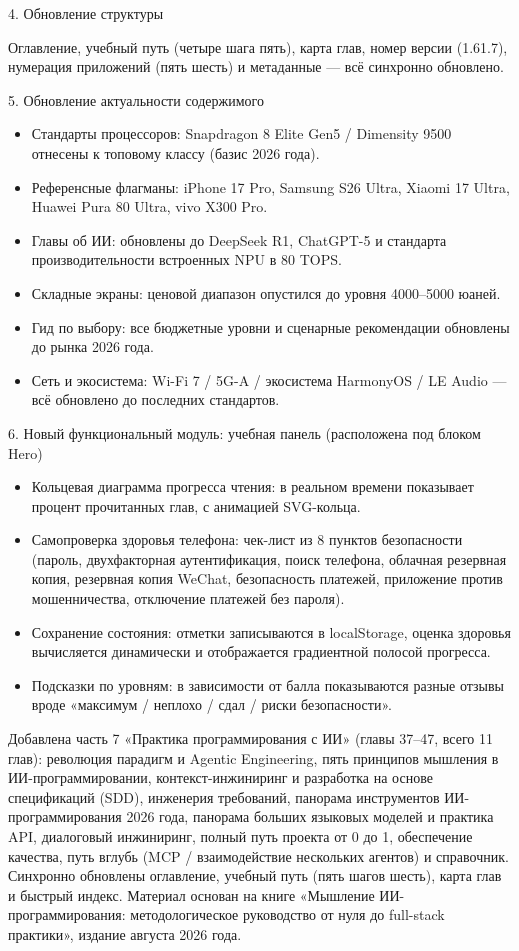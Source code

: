 4. Обновление структуры

Оглавление, учебный путь (четыре шага пять), карта глав, номер версии (1.61.7), нумерация приложений (пять шесть) и метаданные — всё синхронно обновлено.

5. Обновление актуальности содержимого

\begin{itemize}
  \item Стандарты процессоров: Snapdragon 8 Elite Gen5 / Dimensity 9500 отнесены к топовому классу (базис 2026 года).
  \item Референсные флагманы: iPhone 17 Pro, Samsung S26 Ultra, Xiaomi 17 Ultra, Huawei Pura 80 Ultra, vivo X300 Pro.
  \item Главы об ИИ: обновлены до DeepSeek R1, ChatGPT-5 и стандарта производительности встроенных NPU в 80 TOPS.
  \item Складные экраны: ценовой диапазон опустился до уровня 4000–5000 юаней.
  \item Гид по выбору: все бюджетные уровни и сценарные рекомендации обновлены до рынка 2026 года.
  \item Сеть и экосистема: Wi-Fi 7 / 5G-A / экосистема HarmonyOS / LE Audio — всё обновлено до последних стандартов.
\end{itemize}

6. Новый функциональный модуль: учебная панель (расположена под блоком Hero)

\begin{itemize}
  \item Кольцевая диаграмма прогресса чтения: в реальном времени показывает процент прочитанных глав, с анимацией SVG-кольца.
  \item Самопроверка здоровья телефона: чек-лист из 8 пунктов безопасности (пароль, двухфакторная аутентификация, поиск телефона, облачная резервная копия, резервная копия WeChat, безопасность платежей, приложение против мошенничества, отключение платежей без пароля).
  \item Сохранение состояния: отметки записываются в localStorage, оценка здоровья вычисляется динамически и отображается градиентной полосой прогресса.
  \item Подсказки по уровням: в зависимости от балла показываются разные отзывы вроде «максимум / неплохо / сдал / риски безопасности».
\end{itemize}


Добавлена часть 7 «Практика программирования с ИИ» (главы 37–47, всего 11 глав): революция парадигм и Agentic Engineering, пять принципов мышления в ИИ-программировании, контекст-инжиниринг и разработка на основе спецификаций (SDD), инженерия требований, панорама инструментов ИИ-программирования 2026 года, панорама больших языковых моделей и практика API, диалоговый инжиниринг, полный путь проекта от 0 до 1, обеспечение качества, путь вглубь (MCP / взаимодействие нескольких агентов) и справочник. Синхронно обновлены оглавление, учебный путь (пять шагов шесть), карта глав и быстрый индекс. Материал основан на книге «Мышление ИИ-программирования: методологическое руководство от нуля до full-stack практики», издание августа 2026 года.

